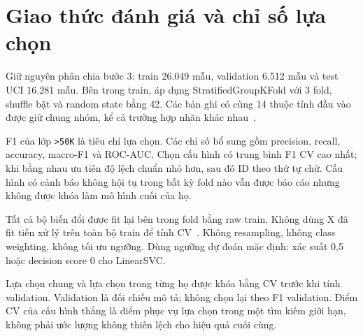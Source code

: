 \section{Giao thức đánh giá và chỉ số lựa chọn}
\label{sec:5_2}
Giữ nguyên phân chia bước 3: train 26.049 mẫu, validation 6.512 mẫu và test UCI 16.281 mẫu. Bên trong train, áp dụng StratifiedGroupKFold với 3 fold, shuffle bật và random state bằng 42. Các bản ghi có cùng 14 thuộc tính đầu vào được giữ chung nhóm, kể cả trường hợp nhãn khác nhau~\cite{sklearn-sgkf}.

F1 của lớp \texttt{>50K} là tiêu chí lựa chọn. Các chỉ số bổ sung gồm precision, recall, accuracy, macro-F1 và ROC-AUC. Chọn cấu hình có trung bình F1 CV cao nhất; khi bằng nhau ưu tiên độ lệch chuẩn nhỏ hơn, sau đó ID theo thứ tự chữ. Cấu hình có cảnh báo không hội tụ trong bất kỳ fold nào vẫn được báo cáo nhưng không được khóa làm mô hình cuối của họ.

Tất cả bộ biến đổi được fit lại bên trong fold bằng raw train. Không dùng X đã fit tiền xử lý trên toàn bộ train để tính CV~\cite{sklearn-pitfalls}. Không resampling, không class weighting, không tối ưu ngưỡng. Dùng ngưỡng dự đoán mặc định: xác suất 0,5 hoặc decision score 0 cho LinearSVC.

Lựa chọn chung và lựa chọn trong từng họ được khóa bằng CV trước khi tính validation. Validation là đối chiếu mô tả; không chọn lại theo F1 validation. Điểm CV của cấu hình thắng là điểm phục vụ lựa chọn trong một tìm kiếm giới hạn, không phải ước lượng không thiên lệch cho hiệu quả cuối cùng.
